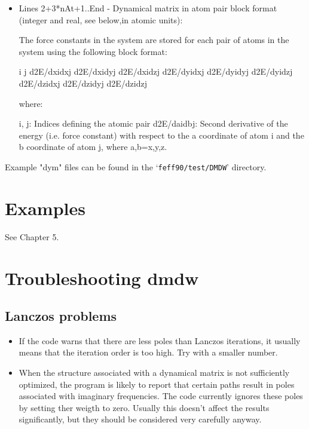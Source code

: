 \documentclass[11pt,oneside]{report} %
\renewcommand{\htmlref}[2]{\hyperlink{#2}{#1}}
\newcommand{\file}[1]{`\texttt{#1}'}
\newcommand{\module}[1]{\textrm{\bf{#1}}}
\renewcommand{\htmlref}[2]{{#1}} %
\begin{document}
\begin{latexonly}
\begin{itemize}
\item Lines 2+3*nAt+1..End - Dynamical matrix in atom pair block format (integer and
                       real, see below,in atomic units):

  The force constants in the system are stored for each pair of atoms in the
  system using the following block format:

     i j
     d2E/dxidxj d2E/dxidyj d2E/dxidzj
     d2E/dyidxj d2E/dyidyj d2E/dyidzj
     d2E/dzidxj d2E/dzidyj d2E/dzidzj

  where:
  
     i, j: Indices defining the atomic pair
     d2E/daidbj: Second derivative of the energy (i.e. force constant) with
                 respect to the a coordinate of atom i and the b coordinate of
		 atom j, where a,b={x,y,z}.
\end{itemize}

Example "dym" files can be found in the \file{feff90/test/DMDW} directory.


\section{Examples}
\label{sec:Append-G-DMDW-Example}

See \htmlref{Chapter 5}{sec:DWfactors}.

\section{Troubleshooting \module{dmdw}}
\label{sec:Append-G-DMDW-Trouble}

\subsection{Lanczos problems}
\begin{itemize}
\item If the code warns that there are less poles than Lanczos iterations, it
  usually means that the iteration order is too high. Try with a smaller
  number.

\item When the structure associated with a dynamical matrix is not sufficiently
  optimized, the program is likely to report that certain paths result in
  poles associated with imaginary frequencies. The code currently ignores
  these poles by setting ther weigth to zero. Usually this doesn't affect the
  results significantly, but they should be considered very carefully anyway.


\end{itemize}
\end{latexonly}
\end{document}
